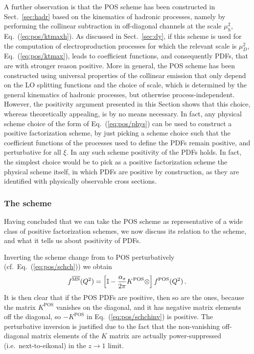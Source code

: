 A further observation is that the POS
scheme has been constructed in Sect.~\ref{sec:hadr} based on the kinematics of hadronic processes,
namely by performing the collinear subtraction in off-diagonal
channels at the scale  $\mu_h^2$,
Eq.~(\ref{eq:pos/ktmaxh}). As discussed in Sect.~\ref{sec:dy}, if this
scheme is used for the computation of electroproduction processes for
which the relevant scale is $\mu_D^2$, Eq.~(\ref{eq:pos/ktmax}), leads
to coefficient functions, and consequently PDFs, that are with stronger
reason positive. More in general, the POS scheme has been constructed
using universal properties of the collinear emission that only
depend on the LO splitting functions and the choice of scale, which is
determined by the general kinematics of hadronic processes, but
otherwise process-independent. However, the positivity argument
presented in this Section shows that this choice, whereas theoretically
appealing, is by no means necessary. In fact, any physical scheme
choice of the form of Eq.~(\ref{eq:pos/phys}) can be used to construct a
positive factorization scheme, by just picking a scheme choice such
that the coefficient functions of the processes used to define the
PDFs remain positive, and perturbative for all $\xi$.
In any such scheme positivity of the PDFs
holds. In fact, the simplest choice would be to pick as a
positive factorization scheme the physical scheme itself, in which
PDFs are positive by construction, as they are identified with
physically observable cross sections.

\subsubsection{The \msbar{} scheme}
\label{sec:posmsbar}


Having concluded that we can take the POS scheme as representative of
a wide class of positive factorization schemes, we now discuss 
its relation to the \msbar{} scheme, and what it
tells us about positivity of \msbar{} PDFs.

Inverting the scheme change from \msbar{} to POS perturbatively (cf.\ Eq.~(\ref{eq:pos/schch}))
we obtain
\begin{equation}
  \label{eq:pos/schchinv}
 f^{{\overline{\textrm{MS}}}}(Q^2)=\left[\mathbb{I}
  -\frac{\alpha_s}{2\pi}  K^{\textrm{POS}}\otimes \right]  f^{\textrm{POS}}(Q^2) \,.
\end{equation}
It is then clear that if the POS PDFs are positive, then so are the
\msbar{} ones, because the matrix $K^{\textrm{POS}}$ vanishes on the
diagonal, and it has negative matrix elements off the diagonal, so
$-K^{\textrm{POS}}$ in Eq.~(\ref{eq:pos/schchinv}) is positive.
The perturbative inversion is justified due to the fact that the
non-vanishing off-diagonal matrix elements of the $K$ matrix are
actually power-suppressed (i.e.\ next-to-eikonal) in the $z\to 1$
limit.

